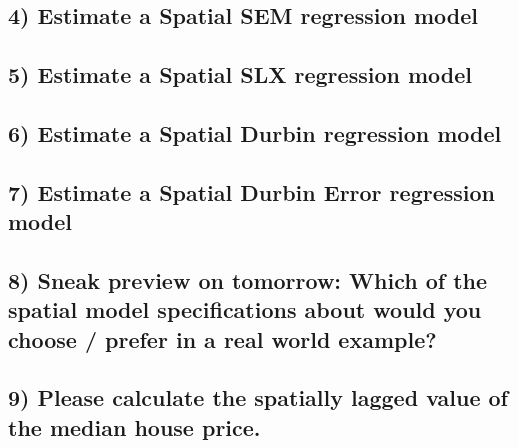 \documentclass[
  letterpaper,
  DIV=11,
  numbers=noendperiod]{scrreprt}
\begin{document}
\hypertarget{estimate-a-spatial-sem-regression-model}{%
\subsection*{4) Estimate a Spatial SEM regression
model}\label{estimate-a-spatial-sem-regression-model}}

\hypertarget{estimate-a-spatial-slx-regression-model}{%
\subsection*{5) Estimate a Spatial SLX regression
model}\label{estimate-a-spatial-slx-regression-model}}

\hypertarget{estimate-a-spatial-durbin-regression-model}{%
\subsection*{6) Estimate a Spatial Durbin regression
model}\label{estimate-a-spatial-durbin-regression-model}}

\hypertarget{estimate-a-spatial-durbin-error-regression-model}{%
\subsection*{7) Estimate a Spatial Durbin Error regression
model}\label{estimate-a-spatial-durbin-error-regression-model}}

\hypertarget{sneak-preview-on-tomorrow-which-of-the-spatial-model-specifications-about-would-you-choose-prefer-in-a-real-world-example}{%
\subsection{8) Sneak preview on tomorrow: Which of the spatial model
specifications about would you choose / prefer in a real world
example?}\label{sneak-preview-on-tomorrow-which-of-the-spatial-model-specifications-about-would-you-choose-prefer-in-a-real-world-example}}

\hypertarget{please-calculate-the-spatially-lagged-value-of-the-median-house-price.}{%
\subsection{9) Please calculate the spatially lagged value of the median
house
price.}\label{please-calculate-the-spatially-lagged-value-of-the-median-house-price.}}
\end{document}
